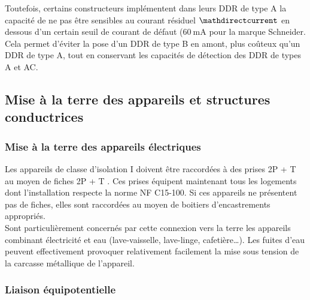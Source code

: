 Toutefois, certains constructeurs implémentent dans leurs DDR de type A la capacité de ne pas être sensibles au courant résiduel $\mathdirectcurrent$ en dessous d'un certain seuil de courant de défaut ($\SI{60}{\milli\ampere}$ pour la marque Schneider\supercite{Schneider:coordinationDDR}. Cela permet d'éviter la pose d'un DDR de type B en amont, plus coûteux qu'un DDR de type A, tout en conservant les capacités de détection des DDR de types A et AC.

\subsection{Mise à la terre des appareils et structures conductrices}

\subsubsection{Mise à la terre des appareils électriques}

Les appareils de classe d'isolation I doivent être raccordées à des prises 2P + T  au moyen de fiches 2P + T . Ces prises équipent maintenant tous les logements dont l'installation respecte la norme NF C15-100. Si ces appareils ne présentent pas de fiches, elles sont raccordées au moyen de boitiers d'encastrements appropriés.\\
Sont particulièrement concernés par cette connexion vers la terre les appareils combinant électricité et eau (lave-vaisselle, lave-linge, cafetière\ldots {}). Les fuites d'eau peuvent effectivement  provoquer relativement facilement la mise sous tension de la carcasse métallique de l'appareil.

\subsubsection{Liaison équipotentielle}

